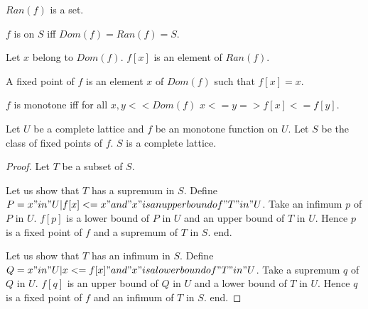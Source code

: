 \documentclass{article}
\begin{document}
\begin{forthel}
    \begin{signature}[RanSort]
      $Ran(f)$ is a set.
    \end{signature}

    \begin{definition}[DefDom]
      $f$ is on $S$ iff $Dom(f) = Ran(f) = S$.
    \end{definition}

    \begin{axiom}[ImgSort]
      Let $x$ belong to $Dom(f)$. $f[x]$ is an element of $Ran(f)$.
    \end{axiom}

    \begin{definition}[DefFix]
      A fixed point of $f$ is an element $x$ of $Dom(f)$ such that $f[x] = x$.
    \end{definition}

    \begin{definition}[DefMonot]
      $f$ is monotone iff for all $x,y << Dom(f)$ $x <= y => f[x] <= f[y]$.
    \end{definition}


    \begin{theorem}[Tarski]
      Let $U$ be a complete lattice and $f$ be an monotone function on $U$. Let $S$ be the class of fixed points of $f$. $S$ is a complete lattice.
    \end{theorem}
    \begin{proof}
      Let $T$ be a subset of $S$.

      Let us show that $T$ has a supremum in $S$.
        Define $P = {x "in" U | f[x] <= x "and" x "is an upper bound of" T "in" U}$. Take an infimum $p$ of $P$ in $U$. $f[p]$ is a lower bound of $P$ in $U$ and an upper bound of $T$ in $U$. Hence $p$ is a fixed point of $f$ and a supremum of $T$ in $S$.
      end.

      Let us show that $T$ has an infimum in $S$.
        Define $Q = {x "in" U | x <= f[x] "and" x "is a lower bound of" T "in" U}$. Take a supremum $q$ of $Q$ in $U$. $f[q]$ is an upper bound of $Q$ in $U$ and a lower bound of $T$ in $U$. Hence $q$ is a fixed point of $f$ and an infimum of $T$ in $S$.
      end.
    \end{proof}
  \end{forthel}
\end{document}
